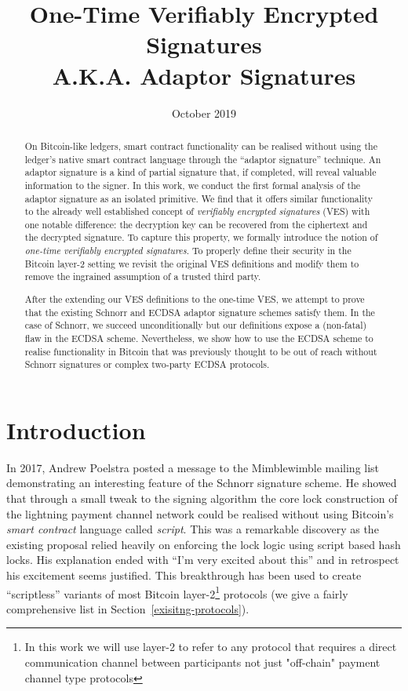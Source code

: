 \documentclass[fullpage]{article}
\title{One-Time Verifiably Encrypted Signatures \\ A.K.A. Adaptor Signatures}
\date{October 2019}
\theoremstyle{definition}
\begin{document}
\maketitle

\begin{abstract}
  On Bitcoin-like ledgers, smart contract functionality can be realised without using the ledger's native smart contract language through the ``adaptor signature'' technique\cite{poelstra-adaptor}. An adaptor signature is a kind of partial signature that, if completed, will reveal valuable information to the signer. In this work, we conduct the first formal analysis of the adaptor signature as an isolated primitive. We find that it offers similar functionality to the already well established concept of \emph{verifiably encrypted signatures} (VES) with one notable difference: the decryption key can be recovered from the ciphertext and the decrypted signature. To capture this property, we formally introduce the notion of \emph{one-time verifiably encrypted signatures}. To properly define their security in the Bitcoin layer-2 setting we revisit the original VES definitions and modify them to remove the ingrained assumption of a trusted third party.

  After the extending our VES definitions to the one-time VES, we attempt to prove that the existing Schnorr and ECDSA adaptor signature schemes satisfy them. In the case of Schnorr, we succeed unconditionally but our definitions expose a (non-fatal) flaw in the ECDSA scheme. Nevertheless, we show how to use the ECDSA scheme to realise functionality in Bitcoin that was previously thought to be out of reach without Schnorr signatures or complex two-party ECDSA protocols.
\end{abstract}

\section{Introduction}

In 2017, Andrew Poelstra posted a message to the Mimblewimble mailing list\cite{poelstra-bitcoin-dev-scriptless} demonstrating an interesting feature of the Schnorr signature scheme. He showed that through a small tweak to the signing algorithm the core lock construction of the lightning payment channel network\cite{poon2016bitcoin} could be realised without using Bitcoin's \emph{smart contract} language called \emph{script}. This was a remarkable discovery as the existing proposal relied heavily on enforcing the lock logic using script based hash locks. His explanation ended with ``I'm very excited about this'' and in retrospect his excitement seems justified. This breakthrough has been used to create ``scriptless'' variants of most Bitcoin layer-2\footnote{In this work we will use layer-2 to refer to any protocol that requires a direct communication channel between participants not just "off-chain" payment channel type protocols} protocols (we give a fairly comprehensive list in Section~\ref{exisitng-protocols}).
\end{document}
